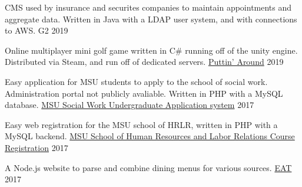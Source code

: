 
\begin{cventries}
  \cventry
  {CMS used by insurance and securites companies to maintain appointments and aggregate data.
  Written in Java with a LDAP user system, and with connections to AWS.}
  {G2}
  {}
  {2019}
  {
  }

  \cventry
    {Online multiplayer mini golf game written in C\# running off of the unity engine. Distributed via Steam,
    and run off of dedicated servers.}
    {\href{https://store.steampowered.com/app/1002650/Puttin_Around/}{Puttin' Around}}
    {}
    {2019}
    {
    }

    \cventry
    {Easy application for MSU students to apply to the school of social work. Administration portal not publicly avaliable.
    Written in PHP with a MySQL database.}
    {\href{https://swdb.socialwork.msu.edu/basw/}{MSU Social Work Undergraduate Application system}}
    {}
    {2017}
    {
    }

    \cventry
    {Easy web registration for the MSU school of HRLR, written in PHP with a MySQL backend. }
    {\href{https://hrlr.msu.edu/registration/login.php}{MSU School of Human Resources and Labor Relations Course Registration}}
    {}
    {2017}
    {
    }

  \cventry
    {A Node.js website to parse and combine dining menus for various sources.}
    {\href{https://github.com/oonis/eat}{EAT}}
    {}
    {2017}
    {
    }



\end{cventries}
